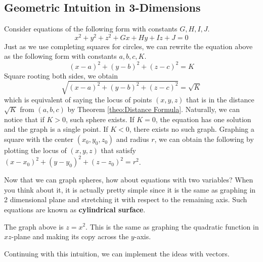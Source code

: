 \documentclass[../../main.tex]{subfiles}
\begin{document}
\subsection{Geometric Intuition in 3-Dimensions}

Consider equations of the following form with constants $G, H, I, J$.
\[
x^2 + y^2 + z^2 + Gx + Hy + Iz + J = 0
\]
Just as we use completing squares for circles, we can rewrite the
equation above as the following form with constants $a, b, c, K$.
\[
(x - a)^2 + (y - b)^2 + (z - c)^2 = K
\]
Square rooting both sides, we obtain
\[
\sqrt{(x - a)^2 + (y - b)^2 + (z - c)^2}
= \sqrt{K}
\]
which is equivalent of saying the locus of points $(x, y, z)$ that is
in the distance $\sqrt{K}$ from $(a, b, c)$ by Theorem
\ref{theo:Distance Formula}. Naturally, we can notice that if $K > 0$,
such sphere exists. If $K = 0$, the equation has one solution and
the graph is a single point. If $K < 0$, there exists no such graph.
Graphing a square with the center $(x_0, y_0, z_0)$ and radius $r$,
we can obtain the following by plotting the locus of $(x, y, z)$
that satisfy $(x - x_0)^2 + (y - y_0)^2 + (z - z_0)^2 = r^2$.

\begin{figure}[H]
\centering
{}
\end{figure}

Now that we can graph spheres, how about equations with two variables?
When you think about it, it is actually pretty simple since it is the
same as graphing in 2 dimensional plane and stretching it with respect
to the remaining axis. Such equations are known as
\textbf{cylindrical surface}.

\begin{figure}[H]
\centering
{}
\end{figure}

The graph above is $z = x^2$. This is the same as graphing the
quadratic function in $xz$-plane and making its copy across the
$y$-axis.

Continuing with this intuition, we can implement the ideas with
vectors.
\end{document}
